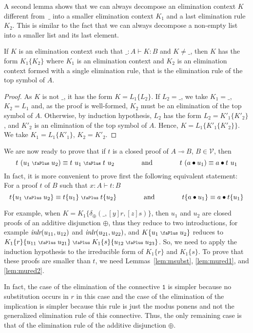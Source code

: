 \documentclass[screen, sigconf,authorversion,nonacm]{acmart}
\theoremstyle{acmdefinition}
\numberwithin{equation}{section}
\newcommand\abstr[1]{[#1]}
\newcommand\inlr{\mbox{\it inlr}}
\newcommand\plus{\mathrel{\text{\normalfont\scalebox{0.7}{\faPlus}}}}
\newcommand\one{\ensuremath{\mathtt 1}}
\newcommand\elimplus{\delta_{\oplus}}
\begin{document}
A second lemma shows that we can always decompose an elimination
context $K$ different from~$\_$ into a smaller elimination context
$K_1$ and a last elimination rule $K_2$.  This is similar to the fact
that we can always decompose a non-empty list into a smaller list and
its last element.

\begin{lemma}
  \label{horrible}
  If $K$ is an elimination context such that $\_:A \vdash K:B$
  and $K \neq \_$, then $K$ has the form $K_1\{K_2\}$
  where $K_1$ is an elimination context and
  $K_2$ is an elimination context formed with a single
  elimination rule, that is the elimination rule of the top symbol of $A$.
\end{lemma}

\begin{proof}
  As $K$ is not $\_$, it has the form $K = L_1\{L_2\}$.
  If $L_2 = \_$, we take $K_1 = \_$, $K_2 = L_1$ and, as the proof is
  well-formed, $K_2$ must be an elimination of the top symbol of $A$.
  Otherwise, by induction hypothesis, $L_2$ has the form $L_2 = K'_1\{K'_2\}$,
  and $K'_2$ is an elimination of the top symbol of $A$.
  Hence, $K = L_1\{K'_1\{K'_2\}\}$. We take $K_1 = L_1\{K'_1\}$, $K_2 = K'_2$.
  \qedhere
\end{proof}

We are now ready to prove that
if $t$ is a closed proof of $A \multimap B$, $B \in {\mathcal V}$,
then 
$$t~(u_1 \plus u_2) \equiv t~u_1 \plus t~u_2
\qquad\qquad\textrm{and}\qquad\qquad
t~(a \bullet u_1) \equiv a \bullet t~u_1$$
In fact, it is more convenient to prove first the following equivalent
statement: For a proof $t$ of $B$ such that $x:A \vdash t:B$
$$t\{u_1 \plus u_2\} \equiv t\{u_1\} \plus t\{u_2\}
\qquad\qquad\textrm{and}\qquad\qquad
t\{a \bullet u_1\} \equiv a \bullet t\{u_1\}$$

For example, when $K = K_1 \{\elimplus(\_,\abstr{y}r,\abstr{z}s)\}$,
then $u_1$ and $u_2$ are closed proofs of an additive disjunction
$\oplus$, thus they reduce to two introductions, for example
$\inlr(u_{11},u_{12})$ and $\inlr(u_{21},u_{22})$, and $K\{u_1 \plus
u_2\}$ reduces to $K_1\{r\}\{u_{11} \plus u_{21}\} \plus
K_1\{s\}\{u_{12} \plus u_{23}\}$. So, we need to apply the induction
hypothesis to the irreducible form of $K_1 \{r\}$ and $K_1\{s\}$. To
prove that these proofs are smaller than $t$, we need
Lemmas~\ref{lem:msubst}, \ref{lem:mured1}, and \ref{lem:mured2}.

In fact, 
the case of the elimination of the
connective $\one$ is simpler because no substitution occurs in $r$
in this case and the case of the elimination of the implication is
simpler because this rule is just the modus ponens and not the
generalized elimination rule of this connective. Thus, the only remaining
case is that of the elimination rule of the additive disjunction
$\oplus$.
\end{document}
